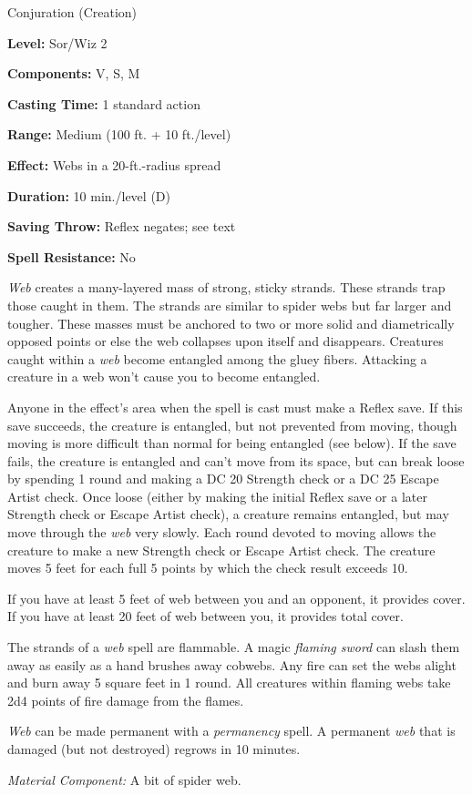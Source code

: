
Conjuration (Creation)

\textbf{Level:} Sor/Wiz 2

\textbf{Components:} V, S, M

\textbf{Casting Time:} 1 standard action

\textbf{Range:} Medium (100 ft. + 10 ft./level)

\textbf{Effect:} Webs in a 20-ft.-radius spread

\textbf{Duration:} 10 min./level (D)

\textbf{Saving Throw:} Reflex negates; see text

\textbf{Spell Resistance:} No

\textit{Web} creates a many-layered mass of strong, sticky strands. These strands 
trap those caught in them. The strands are similar to spider webs but far larger 
and tougher. These masses must be anchored to two or more solid and diametrically 
opposed points or else the web collapses upon itself and disappears. Creatures 
caught within a \textit{web} become entangled among the gluey fibers. Attacking 
a creature in a web won't cause you to become entangled.

Anyone in the effect's area when the spell is cast must make a Reflex save. If 
this save succeeds, the creature is entangled, but not prevented from moving, though 
moving is more difficult than normal for being entangled (see below). If the save 
fails, the creature is entangled and can't move from its space, but can break loose 
by spending 1 round and making a DC 20 Strength check or a DC 25 Escape Artist 
check. Once loose (either by making the initial Reflex save or a later Strength 
check or Escape Artist check), a creature remains entangled, but may move through 
the \textit{web} very slowly. Each round devoted to moving allows the creature 
to make a new Strength check or Escape Artist check. The creature moves 5 feet 
for each full 5 points by which the check result exceeds 10.

If you have at least 5 feet of web between you and an opponent, it provides cover. 
If you have at least 20 feet of web between you, it provides total cover.

The strands of a \textit{web} spell are flammable. A magic \textit{flaming sword 
}can slash them away as easily as a hand brushes away cobwebs. Any fire can set 
the webs alight and burn away 5 square feet in 1 round. All creatures within flaming 
webs take 2d4 points of fire damage from the flames.

\textit{Web} can be made permanent with a \textit{permanency} spell. A permanent 
\textit{web} that is damaged (but not destroyed) regrows in 10 minutes.

\textit{Material Component:} A bit of spider web.

